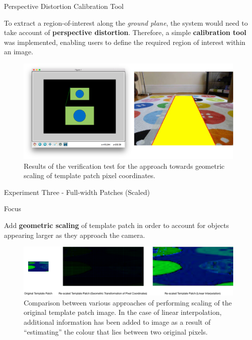 \documentclass[10pt, compress]{beamer}
\begin{document}
\begin{frame}{Perspective Distortion Calibration Tool}

\vspace{-5pt}

To extract a region-of-interest along the \textit{ground plane}, the system would need to take account of \textbf{perspective distortion}. Therefore, a simple \textbf{calibration tool} was implemented, enabling users to define the required region of interest within an image.

 \begin{figure}[ht!]
\centering
\includegraphics[scale=0.16]{calib_tool}
\vspace{-10pt}
 \caption{{\small Results of the verification test for the approach towards geometric scaling of template patch pixel coordinates.}}
\end{figure}

\end{frame}


\begin{frame}{Experiment Three - Full-width Patches (Scaled)}

\begin{block}{Focus}

Add \textbf{geometric scaling} of template patch in order to account for objects appearing larger as they approach the camera. 
	
\end{block}
 \vspace{15pt}
  \begin{figure}[ht!]
\centering
\includegraphics[scale=0.28]{scaling_types}
 \caption{{\small Comparison between various approaches of performing scaling of the original template patch image. In the case of linear interpolation, additional information has been added to image as a result of “estimating” the colour that lies between two original pixels.}}
\end{figure}

\end{frame}
\end{document}
